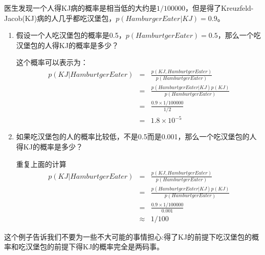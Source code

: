 \documentclass[10pt,a4paper,UTF8]{article}
\begin{document}
\begin{instance}
医生发现一个人得KJ病的概率是相当低的大约是\(1/100000\)，但是得了Kreuzfeld-Jacob(KJ)病的人几乎都吃汉堡包，\(p(Hamburger Eater| KJ) = 0.9\)。
\begin{enumerate}
\item 假设一个人吃汉堡包的概率是0.5，\(p(Hamburtger Eater) = 0.5\)，那么一个吃汉堡包的人得KJ的概率是多少？

这个概率可以表示为：
\begin{eqnarray}
\label{eq:1}
p(KJ| Hamburtger Eater) &=& \frac{p(KJ,Hamburtger Eater)}{p(Hamburtger Eater)} \\
 &=& \frac{p(Hamburtger Eater | KJ)p(KJ)}{p(Hamburtger Eater)} \\
&=& \frac{0.9\times 1/100000}{1/2} \\
&=& 1.8\times 10^{-5}
\end{eqnarray}

\item 如果吃汉堡包的人的概率比较低，不是0.5而是0.001，那么一个吃汉堡包的人得KJ的概率是多少？

重复上面的计算
\begin{eqnarray}
\label{eq:2}
p(KJ| Hamburtger Eater) &=& \frac{p(KJ,Hamburtger Eater)}{p(Hamburtger Eater)}\\ 
&=& \frac{p(Hamburtger Eater | KJ)p(KJ)}{p(Hamburtger Eater)} \\
&=& \frac{0.9\times 1/100000}{0.001} \\
&\approx&  1/100
\end{eqnarray}
\end{enumerate}
\end{instance}
这个例子告诉我们不要为一些不大可能的事情担心:得了KJ的前提下吃汉堡包的概率和吃汉堡包的前提下得KJ的概率完全是两码事。
\end{document}
